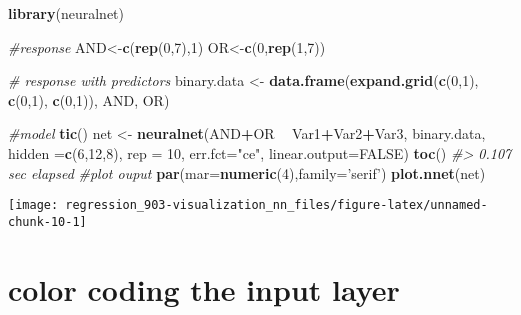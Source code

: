 \documentclass[]{book}
\newenvironment{Shaded}{\begin{snugshade}}{\end{snugshade}}
\newcommand{\CommentTok}[1]{\textcolor[rgb]{0.56,0.35,0.01}{\textit{#1}}}
\newcommand{\DataTypeTok}[1]{\textcolor[rgb]{0.13,0.29,0.53}{#1}}
\newcommand{\DecValTok}[1]{\textcolor[rgb]{0.00,0.00,0.81}{#1}}
\newcommand{\KeywordTok}[1]{\textcolor[rgb]{0.13,0.29,0.53}{\textbf{#1}}}
\newcommand{\NormalTok}[1]{#1}
\newcommand{\OperatorTok}[1]{\textcolor[rgb]{0.81,0.36,0.00}{\textbf{#1}}}
\newcommand{\OtherTok}[1]{\textcolor[rgb]{0.56,0.35,0.01}{#1}}
\newcommand{\StringTok}[1]{\textcolor[rgb]{0.31,0.60,0.02}{#1}}
\begin{document}
\begin{Shaded}
\begin{Highlighting}[]
\KeywordTok{library}\NormalTok{(neuralnet)}
 
\CommentTok{#response}
\NormalTok{AND<-}\KeywordTok{c}\NormalTok{(}\KeywordTok{rep}\NormalTok{(}\DecValTok{0}\NormalTok{,}\DecValTok{7}\NormalTok{),}\DecValTok{1}\NormalTok{)}
\NormalTok{OR<-}\KeywordTok{c}\NormalTok{(}\DecValTok{0}\NormalTok{,}\KeywordTok{rep}\NormalTok{(}\DecValTok{1}\NormalTok{,}\DecValTok{7}\NormalTok{))}
 
\CommentTok{# response with predictors}
\NormalTok{binary.data <-}\StringTok{ }\KeywordTok{data.frame}\NormalTok{(}\KeywordTok{expand.grid}\NormalTok{(}\KeywordTok{c}\NormalTok{(}\DecValTok{0}\NormalTok{,}\DecValTok{1}\NormalTok{), }\KeywordTok{c}\NormalTok{(}\DecValTok{0}\NormalTok{,}\DecValTok{1}\NormalTok{), }\KeywordTok{c}\NormalTok{(}\DecValTok{0}\NormalTok{,}\DecValTok{1}\NormalTok{)), AND, OR)}
 
\CommentTok{#model}
\KeywordTok{tic}\NormalTok{()}
\NormalTok{net <-}\StringTok{ }\KeywordTok{neuralnet}\NormalTok{(AND}\OperatorTok{+}\NormalTok{OR }\OperatorTok{~}\StringTok{ }\NormalTok{Var1}\OperatorTok{+}\NormalTok{Var2}\OperatorTok{+}\NormalTok{Var3,}
\NormalTok{                 binary.data, }\DataTypeTok{hidden =}\KeywordTok{c}\NormalTok{(}\DecValTok{6}\NormalTok{,}\DecValTok{12}\NormalTok{,}\DecValTok{8}\NormalTok{), }
                 \DataTypeTok{rep =} \DecValTok{10}\NormalTok{, }
                 \DataTypeTok{err.fct=}\StringTok{"ce"}\NormalTok{, }
                 \DataTypeTok{linear.output=}\OtherTok{FALSE}\NormalTok{)}
\KeywordTok{toc}\NormalTok{()}
\CommentTok{#> 0.107 sec elapsed}
\CommentTok{#plot ouput}
\KeywordTok{par}\NormalTok{(}\DataTypeTok{mar=}\KeywordTok{numeric}\NormalTok{(}\DecValTok{4}\NormalTok{),}\DataTypeTok{family=}\StringTok{'serif'}\NormalTok{)}
\KeywordTok{plot.nnet}\NormalTok{(net)}
\end{Highlighting}
\end{Shaded}

\begin{center}\texttt{[image: regression\_903-visualization\_nn\_files/figure-latex/unnamed-chunk-10-1]} \end{center}

\hypertarget{color-coding-the-input-layer}{%
\section{color coding the input layer}\label{color-coding-the-input-layer}}
\end{document}
